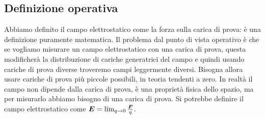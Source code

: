 \subsection{Definizione operativa}
Abbiamo definito il campo elettrostatico come la forza sulla carica di prova: è una definizione puramente matematica. Il problema dal punto di vista operativo è che se vogliamo misurare un campo elettrostatico con una carica di prova, questa modificherà la distribuzione di cariche generatrici del campo e quindi usando cariche di prova diverse troveremo campi leggermente diversi. Bisogna allora usare cariche di prova più piccole possibili, in teoria tendenti a zero. In realtà il campo non dipende dalla carica di prova, è una proprietà fisica dello spazio, ma per misurarlo abbiamo bisogno di una carica di prova. Si potrebbe definire il campo elettrostatico come $\boldsymbol{E}=\lim_{q\to 0}\frac{\boldsymbol{F}}{q}$.
